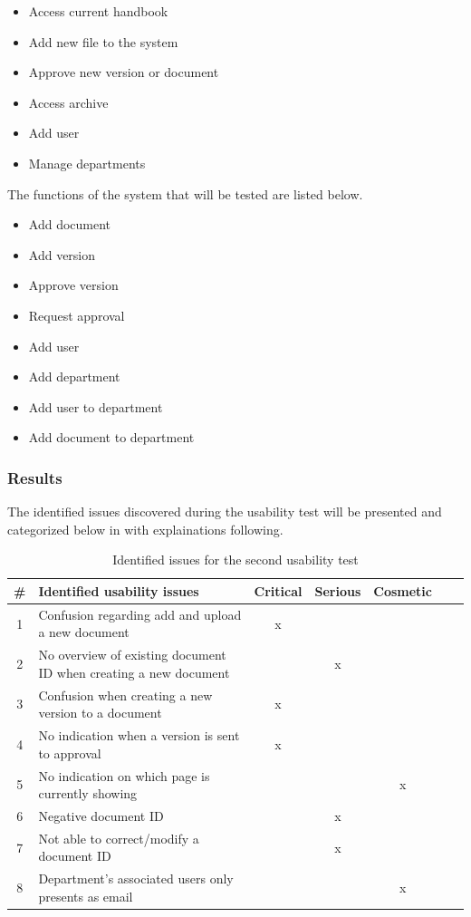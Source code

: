 \begin{itemize}
	\item Access current handbook 
	\item Add new file to the system
	\item Approve new version or document
	\item Access archive 
	\item Add user 
	\item Manage departments
\end{itemize}

The functions of the system that will be tested are listed below.

\begin{itemize}
	\item Add document
	\item Add version
	\item Approve version
	\item Request approval
	\item Add user
	\item Add department
	\item Add user to department
	\item Add document to department
\end{itemize}

\subsubsection*{Results}
The identified issues discovered during the usability test will be presented and categorized below in  with explainations following. 

\begin{table}[H]
	\begin{center}
	\begin{tabular}{| c | m{21em} | c | c | c | c | c |}
		\hline
		\# & \textbf{Identified usability issues} & Critical  & Serious & Cosmetic \\
		\hline
		 1 & Confusion regarding add and upload a new document   & x &  &  \\
		\hline
		 2 & No overview of existing document ID when creating a new document &  & x & \\
		\hline
		 3 & Confusion when creating a new version to a document & x & &  \\
		\hline
		4 & No indication when a version is sent to approval & x & & \\
		\hline
		5 & No indication on which page is currently showing &  &  & x \\
		\hline
		6 & Negative document ID &  & x & \\
		\hline
		7 & Not able to correct/modify a document ID & & x &  \\
		\hline
		8 & Department's associated users only presents as email &  &  & x \\
		\hline
	\end{tabular}
	\end{center}
	\caption{Identified issues for the second usability test}\label{tab:utest2}
\end{table}

